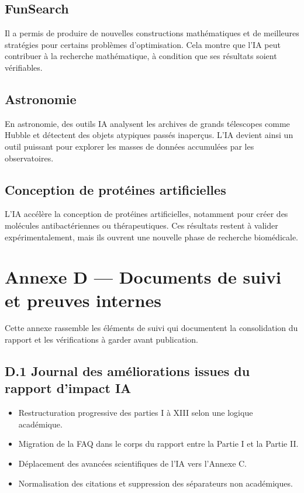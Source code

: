 \documentclass[
  10pt,
  a4paper,
  DIV=11,
  numbers=noendperiod,
  oneside]{scrreprt}
\providecommand{\tightlist}{%
  \setlength{\itemsep}{0pt}\setlength{\parskip}{0pt}}
\begin{document}
\subsection{FunSearch}\label{funsearch}

Il a permis de produire de nouvelles constructions mathématiques et de
meilleures stratégies pour certains problèmes d'optimisation. Cela
montre que l'IA peut contribuer à la recherche mathématique, à condition
que ses résultats soient vérifiables.

\subsection{Astronomie}\label{astronomie}

En astronomie, des outils IA analysent les archives de grands télescopes
comme Hubble et détectent des objets atypiques passés inaperçus. L'IA
devient ainsi un outil puissant pour explorer les masses de données
accumulées par les observatoires.

\subsection{Conception de protéines
artificielles}\label{conception-de-protuxe9ines-artificielles}

L'IA accélère la conception de protéines artificielles, notamment pour
créer des molécules antibactériennes ou thérapeutiques. Ces résultats
restent à valider expérimentalement, mais ils ouvrent une nouvelle phase
de recherche biomédicale.

\newpage{}

\section{Annexe D --- Documents de suivi et preuves
internes}\label{annexe-d-documents-de-suivi-et-preuves-internes}

Cette annexe rassemble les éléments de suivi qui documentent la
consolidation du rapport et les vérifications à garder avant
publication.

\subsection{D.1 Journal des améliorations issues du rapport d'impact
IA}\label{d.1-journal-des-amuxe9liorations-issues-du-rapport-dimpact-ia}

\begin{itemize}
\tightlist
\item
  Restructuration progressive des parties I à XIII selon une logique
  académique.
\item
  Migration de la FAQ dans le corps du rapport entre la Partie I et la
  Partie II.
\item
  Déplacement des avancées scientifiques de l'IA vers l'Annexe C.
\item
  Normalisation des citations et suppression des séparateurs non
  académiques.
\end{itemize}
\end{document}
